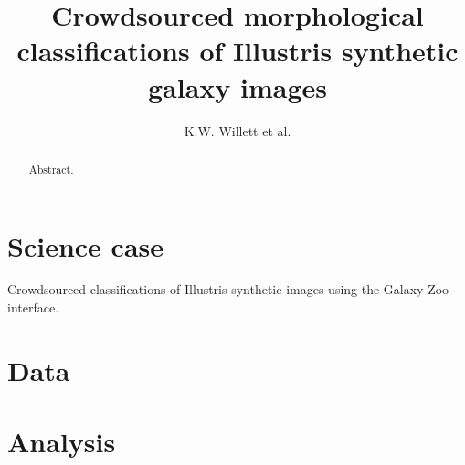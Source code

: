 \documentclass[iop,apj,tighten]{emulateapj}
\begin{document}
\title{Crowdsourced morphological classifications of Illustris synthetic galaxy images}
\author{K.W. Willett et al.}

\begin{abstract}
Abstract.
\end{abstract}

\maketitle

\section{Science case}

Crowdsourced classifications of Illustris synthetic images \citep{sny15,tor15} using the Galaxy Zoo \citep{lin08,wil13} interface. 

\section{Data}

\section{Analysis}



\acknowledgments{
}



\end{document}
